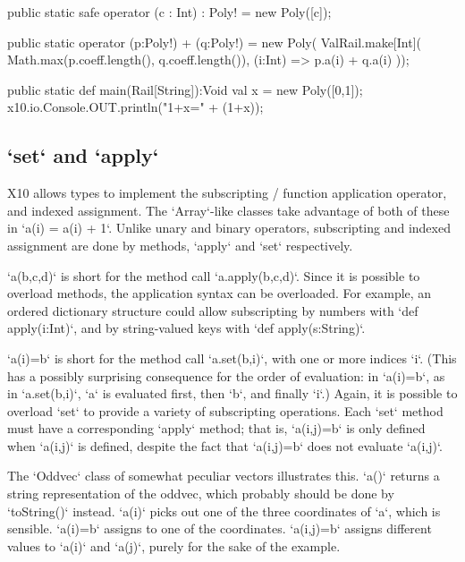 \begin{xten}
  public static safe operator (c : Int) : Poly! = new Poly([c]);

  public static operator (p:Poly!) + (q:Poly!) = new Poly(
      ValRail.make[Int](
        Math.max(p.coeff.length(), q.coeff.length()),
        (i:Int) => p.a(i) + q.a(i)
     ));

  public static def main(Rail[String]):Void {
     val x = new Poly([0,1]);
     x10.io.Console.OUT.println("1+x=" + (1+x));
  }
\end{xten}


\subsection{\xcd`set` and \xcd`apply`}

X10 allows types to implement the subscripting / function application
operator, and indexed assignment.  The \xcd`Array`-like classes take advantage
of both of these in \xcd`a(i) = a(i) + 1`.  Unlike unary and binary operators,
subscripting and indexed assignment are done by methods, \xcd`apply` and
\xcd`set` respectively.

\xcd`a(b,c,d)` is short for the method call \xcd`a.apply(b,c,d)`.  Since it is
possible to overload methods, the application syntax can be overloaded.  For
example, an ordered dictionary structure could allow subscripting by numbers
with \xcd`def apply(i:Int)`, and by string-valued keys with 
\xcd`def apply(s:String)`.  

\xcd`a(i)=b` is short for the method call \xcd`a.set(b,i)`, with one or more
indices \xcd`i`. (This has a
possibly surprising consequence for the order of evaluation: in \xcd`a(i)=b`,
as in \xcd`a.set(b,i)`, \xcd`a` is evaluated first, then \xcd`b`, and finally
\xcd`i`.)  Again, it is possible to overload \xcd`set` to provide a variety of
subscripting operations.  Each \xcd`set` method must have a corresponding
\xcd`apply` method; that is, \xcd`a(i,j)=b` is only defined when \xcd`a(i,j)`
is defined, despite the fact that \xcd`a(i,j)=b` does not evaluate \xcd`a(i,j)`.

The \xcd`Oddvec` class of somewhat peculiar vectors illustrates this.
\xcd`a()` returns a string representation of the oddvec, which probably should
be done by \xcd`toString()` instead.  \xcd`a(i)` picks out one of the three
coordinates of \xcd`a`, which is sensible.  \xcd`a(i)=b` assigns to one of the
coordinates.  \xcd`a(i,j)=b` assigns different values to \xcd`a(i)` and
\xcd`a(j)`, purely for the sake of the example.

